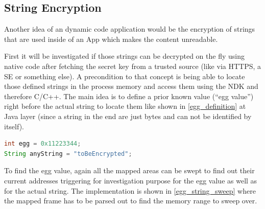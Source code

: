 \subsection{String Encryption}
Another idea of an dynamic code application would be the encryption of strings
that are used inside of an App which makes the content unreadable.

First it will be investigated if those strings can be decrypted on the
fly using native code after fetching the secret key from a trusted source
(like via HTTPS, a SE or something else).
A precondition to that concept is being able to locate those defined strings
in the process memory and access them using the NDK and therefore C/C++.
The main idea is to define a prior known value (``egg value'') right before the actual string to locate them like shown in \autoref{egg_definition} at Java
layer (since a string in the end are just bytes and can not be identified by
itself).
\begin{lstlisting}[language=Java, caption=Egg Value Defining, label=egg_definition]
int egg = 0x11223344;
String anyString = "toBeEncrypted";
\end{lstlisting}
To find the egg value, again all the mapped areas can be swept to find
out their current addresses triggering for investigation purpose for
the egg value as well as for the actual string. The implementation is
shown in \autoref{egg_string_sweep} where the mapped frame has to be
parsed out to find the memory range to sweep over.

